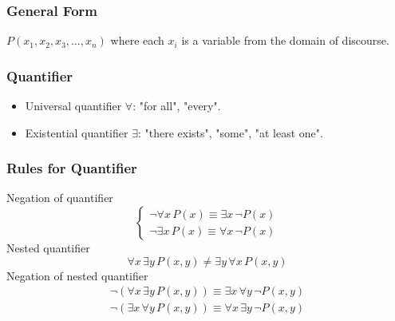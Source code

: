 \documentclass[11pt]{article}
\begin{document}
\subsubsection*{General Form}    
$P(x_1, x_2, x_3, \dots, x_n)$ where each $x_i$ is a variable from the domain of discourse. 
\subsubsection{Quantifier}
\begin{itemize}
    \item Universal quantifier $\forall$: "for all", "every".
    \item Existential quantifier $\exists$: "there exists", "some", "at least one".
\end{itemize}
\subsubsection*{Rules for Quantifier}
Negation of quantifier
\[
    \begin{cases}
        \lnot \forall x \,P(x) \equiv \exists x \,\lnot P(x)\\
        \lnot \exists x \,P(x) \equiv \forall x\, \lnot P(x)
    \end{cases}
\]
Nested quantifier
\[
    \forall x \,\exists y \,P(x, y) \neq \exists y \,\forall x \,P(x, y)
\]
Negation of nested quantifier
\[
    \begin{split}
        \lnot \left(\forall x\, \exists y \, P(x, y)\right) \equiv \exists x\, \forall y\, \lnot P(x, y)\\[.5em]
        \lnot \left(\exists x\, \forall y \, P(x, y)\right) \equiv \forall x\, \exists y\, \lnot P(x, y)
    \end{split}
\]
\end{document}
